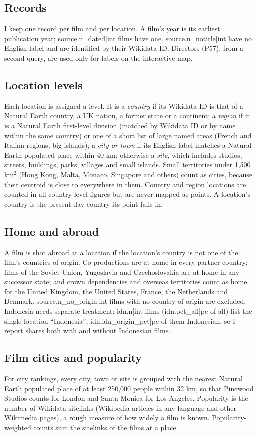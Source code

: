 \documentclass[11pt,a4paper]{article}
\begin{document}
\subsection{Records}
I keep one record per film and per location. A film's year is its earliest publication year; {{source.n_dated|int}} films have one. {{source.n_notitle|int}} have no English label and are identified by their Wikidata ID. Directors (P57), from a second query, are used only for labels on the interactive map.

\subsection{Location levels}
Each location is assigned a level. It is a \emph{country} if its Wikidata ID is that of a Natural Earth country, a UK nation, a former state or a continent; a \emph{region} if it is a Natural Earth first-level division (matched by Wikidata ID or by name within the same country) or one of a short list of large named areas (French and Italian regions, big islands); a \emph{city or town} if its English label matches a Natural Earth populated place within 40 km; otherwise a \emph{site}, which includes studios, streets, buildings, parks, villages and small islands. Small territories under 1,500 km$^2$ (Hong Kong, Malta, Monaco, Singapore and others) count as cities, because their centroid is close to everywhere in them. Country and region locations are counted in all country-level figures but are never mapped as points. A location's country is the present-day country its point falls in.

\subsection{Home and abroad}
A film is shot abroad at a location if the location's country is not one of the film's countries of origin. Co-productions are at home in every partner country; films of the Soviet Union, Yugoslavia and Czechoslovakia are at home in any successor state; and crown dependencies and overseas territories count as home for the United Kingdom, the United States, France, the Netherlands and Denmark. {{source.n_no_origin|int}} films with no country of origin are excluded. Indonesia needs separate treatment: {{idn.n|int}} films ({{idn.pct_all|pc}} of all) list the single location ``Indonesia'', {{idn.idn_origin_pct|pc}} of them Indonesian, so I report shares both with and without Indonesian films.

\subsection{Film cities and popularity}
For city rankings, every city, town or site is grouped with the nearest Natural Earth populated place of at least 250,000 people within 32 km, so that Pinewood Studios counts for London and Santa Monica for Los Angeles. Popularity is the number of Wikidata sitelinks (Wikipedia articles in any language and other Wikimedia pages), a rough measure of how widely a film is known. Popularity-weighted counts sum the sitelinks of the films at a place.
\end{document}
